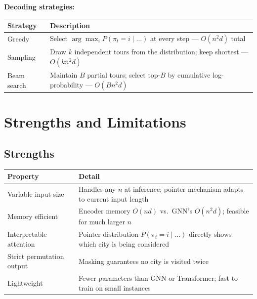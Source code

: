 \documentclass[12pt,a4paper]{article}
\begin{document}
\textbf{Decoding strategies:}

\begin{center}
\begin{tabularx}{\linewidth}{lX}
\toprule
\textbf{Strategy} & \textbf{Description} \\
\midrule
Greedy & Select $\arg\max_i P(\pi_t = i \mid \ldots)$ at every step ---
  $O(n^2 d)$ total \\
Sampling & Draw $k$ independent tours from the distribution; keep shortest ---
  $O(k n^2 d)$ \\
Beam search & Maintain $B$ partial tours; select top-$B$ by cumulative
  log-probability --- $O(B n^2 d)$ \\
\bottomrule
\end{tabularx}
\end{center}

\section{Strengths and Limitations}

\subsection*{Strengths}

\begin{center}
\begin{tabularx}{\linewidth}{lX}
\toprule
\textbf{Property} & \textbf{Detail} \\
\midrule
Variable input size & Handles any $n$ at inference; pointer mechanism adapts
  to current input length \\
Memory efficient & Encoder memory $O(n d)$ vs.\ GNN's $O(n^2 d)$; feasible
  for much larger $n$ \\
Interpretable attention & Pointer distribution $P(\pi_t = i \mid \ldots)$
  directly shows which city is being considered \\
Strict permutation output & Masking guarantees no city is visited twice \\
Lightweight & Fewer parameters than GNN or Transformer; fast to train
  on small instances \\
\bottomrule
\end{tabularx}
\end{center}
\end{document}
